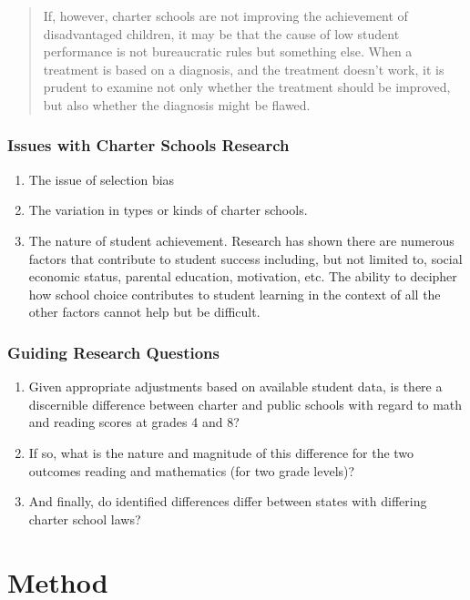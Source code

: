 \documentclass[10pt,slidestop,mathserif]{beamer}
\begin{document}
\begin{frame}[c]
\begin{quote}    %
If, however, charter schools are not improving the achievement of disadvantaged children, it may be that the cause of low student performance is not bureaucratic rules but something else. When a treatment is based on a diagnosis, and the treatment doesn't work, it is prudent to examine not only whether the treatment should be improved, but also whether the diagnosis might be flawed. \cite{Carnoy2005}
\end{quote}
\end{frame}

\begin{frame}[c]
	\frametitle{Issues with Charter Schools Research}
	\begin{enumerate}[<+-| alert@+>]
		\item The issue of selection bias
		\item The variation in types or kinds of charter schools.
		\item The nature of student achievement. Research has shown there are numerous factors that contribute to student success including, but not limited to, social economic status, parental education, motivation, etc. The ability to decipher how school choice contributes to student learning in the context of all the other factors cannot help but be difficult.
	\end{enumerate}
\end{frame}

\begin{frame}[c]
	\frametitle{Guiding Research Questions}
	\begin{enumerate}[<+-| alert@+>]
	\item Given appropriate adjustments based on available student data, is there a discernible difference between charter and public schools with regard to math and reading scores at grades 4 and 8?

	\item If so, what is the nature and magnitude of this difference for the two outcomes reading and mathematics (for two grade levels)?
	
	\item And finally, do identified differences differ between states with differing charter school laws? 	
	\end{enumerate}
\end{frame}

\section{Method}
\end{document}
